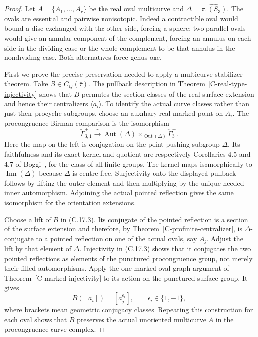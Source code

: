 \documentclass[11pt,oneside]{article}
\begin{document}
\begin{proof}
Let $A=\{A_1,\ldots,A_r\}$ be the real oval multicurve and
$\Delta=\widehat{\pi_1(S_3)}$. The ovals are essential and
pairwise nonisotopic. Indeed a contractible oval would bound
a disc exchanged with the other side, forcing a sphere;
two parallel ovals would give an annular component of the
complement, forcing an annulus on each side in the dividing
case or the whole complement to be that annulus in the
nondividing case. Both alternatives force genus one.

First we prove the precise preservation needed to apply a
multicurve stabilizer theorem. Take $B\in C_Q(\bar\tau)$.
The pullback description in
Theorem~\ref{C-real-type-injectivity} shows that $B$ permutes
the section classes of the real surface extension and hence
their centralizers $\overline{\langle a_i\rangle}$. To identify
the actual curve classes rather than just their procyclic
subgroups, choose an auxiliary real marked point on $A_i$.
The procongruence Birman comparison is the isomorphism
\[
 \check\Gamma_{3,1}^{\pm}
 \xrightarrow{\ \sim\ }
 \operatorname{Aut}(\Delta)
       \mathbin{\times}_{\operatorname{Out}(\Delta)}
                         \check\Gamma_3^{\pm}.
\tag{C.17.3}
\]
Here the map on the left is conjugation on the point-pushing
subgroup $\Delta$. Its faithfulness and its exact kernel and
quotient are respectively Corollaries 4.5 and 4.7 of
Boggi~\cite{CextraBoggiCongruence2020}, for the class of all
finite groups. The kernel maps isomorphically to
$\operatorname{Inn}(\Delta)$ because $\Delta$ is centre-free.
Surjectivity onto the displayed pullback follows by lifting
the outer element and then multiplying by the unique needed
inner automorphism. Adjoining the actual pointed reflection
gives the same isomorphism for the orientation extensions.

Choose a lift of $B$ in (C.17.3). Its conjugate of the pointed
reflection is a section of the surface extension and therefore,
by Theorem~\ref{C-profinite-centralizer}, is $\Delta$-conjugate
to a pointed reflection on one of the actual ovals, say $A_j$.
Adjust the lift by that element of $\Delta$. Injectivity in
(C.17.3) shows that it conjugates the two pointed reflections
as elements of the punctured procongruence group, not merely
their filled automorphisms. Apply the one-marked-oval graph
argument of Theorem~\ref{C-marked-injectivity} to its action
on the punctured surface group. It gives
\[
 B([a_i])=[a_j^{\epsilon_i}],\qquad
                   \epsilon_i\in\{1,-1\},
\tag{C.17.4}
\]
where brackets mean geometric conjugacy classes. Repeating
this construction for each oval shows that $B$ preserves
the actual unoriented multicurve $A$ in the procongruence
curve complex.


\end{proof}
\end{document}
